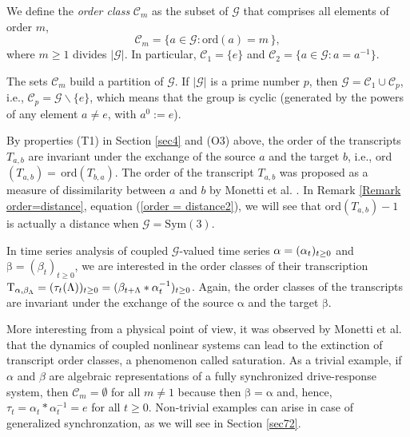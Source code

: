 \documentclass[%
 aip,
 amsmath,amssymb,
 reprint,%
]{revtex4-1}
\begin{document}
We define the \textit{order class} $\mathcal{C}_{m}$ as the subset of $%
\mathcal{G}$ that comprises all elements of order $m$,%
\begin{equation}
\mathcal{C}_{m}=\{a\in \mathcal{G}:\mathrm{ord}(a)=m\,\},  \label{C_m}
\end{equation}%
where $m\geq 1$ divides $\left\vert \mathcal{G}\right\vert $. In particular, 
$\mathcal{C}_{1}=\{e\}$ and $\mathcal{C}_{2}=\{a\in \mathcal{G}:a=a^{-1}\}$.

The sets $\mathcal{C}_{m}$ build a partition of $\mathcal{G}$. If $\left\vert \mathcal{G}\right\vert $ is a prime number $p$,
then $\mathcal{G}=\mathcal{C}_{1}\cup \mathcal{C}_{p}$, i.e., $\mathcal{C}%
_{p}=\mathcal{G}\backslash \{e\}$, which means that the group is cyclic
(generated by the powers of any element $a\neq e$, with $a^{0}:=e$).

By properties (T1) in Section \ref{sec4} and (O3) above, the order of the
transcripts $T_{a,b}$ are invariant under the exchange of the source $a$ and
the target $b$, i.e., \textrm{ord}$(T_{a,b})=\,$\textrm{ord}$(T_{b,a})$. The
order of the transcript $T_{a,b}$ was proposed as a measure of dissimilarity
between $a$ and $b$ by Monetti et al. \cite{Monetti2009}. In Remark \ref{Remark order=distance}, equation (\ref{order = distance2}), we will see that \textrm{ord}$(T_{a,b})-1$ is actually a distance when $\mathcal{G}=\textrm{Sym}(3)$. 

In time series analysis of coupled $\mathcal{G}$-valued time series $\mathrm{%
\alpha }=(\alpha _{t})_{t\geq 0}$ and $\mathrm{\beta }=(\beta _{t})_{t\geq
0} $, we are interested in the order classes of their transcription $\mathrm{%
T}_{\mathrm{\alpha },\mathrm{\beta }_{\Lambda }}=(\tau _{t}(\Lambda
))_{t\geq 0}=(\beta _{t+\Lambda }\ast \alpha _{t}^{-1})_{t\geq 0}$. Again,
the order classes of the transcripts are invariant under the exchange of the
source $\mathrm{\alpha }$ and the target $\mathrm{\beta }$.

More interesting from a physical point of view, it was observed by Monetti
et al. \cite{Monetti2009} that the dynamics of coupled nonlinear systems can
lead to the extinction of transcript order classes, a phenomenon called
saturation. As a trivial example, if $\alpha $ and $\beta $ are algebraic
representations of a fully synchronized drive-response system, then $%
\mathcal{C}_{m}=\emptyset $ for all $m\neq 1$ because then $\mathrm{\beta }=%
\mathrm{\alpha }$ and, hence, $\tau _{t}=\alpha _{t}\ast \alpha _{t}^{-1}=e$
for all $t\geq 0$. Non-trivial examples can arise in case of generalized
synchronzation, as we will see in Section \ref{sec72}.
\end{document}
